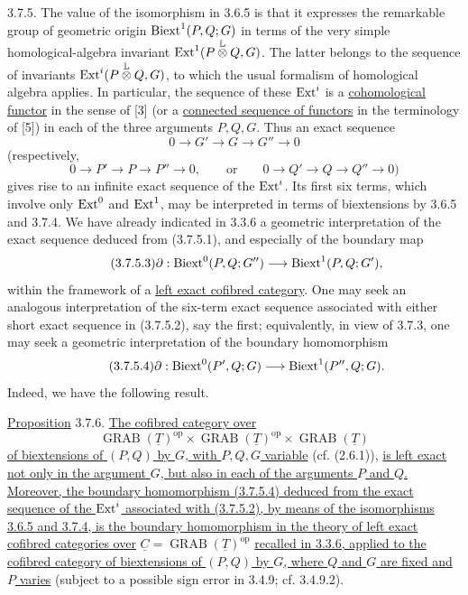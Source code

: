 3.7.5. The value of the isomorphism in 3.6.5 is that it expresses the
remarkable group of geometric origin $\operatorname{Biext}^1(P,Q;G)$ in terms of
the very simple homological-algebra invariant
$\operatorname{Ext}^1(P\mathbin{\overset{\mathbb L}{\otimes}}Q,G)$.  The latter
belongs to the sequence of invariants
$\operatorname{Ext}^i(P\mathbin{\overset{\mathbb L}{\otimes}}Q,G)$, to which the
usual formalism of homological algebra applies.  In particular, the
sequence of these $\operatorname{Ext}^i$ is a \underline{cohomological functor} in
the sense of [3] (or a \underline{connected sequence of functors} in
the terminology of [5]) in each of the three arguments $P,Q,G$.
Thus an exact sequence
\begin{equation}\tag{3.7.5.1}
 0\longrightarrow G'\longrightarrow G\longrightarrow G''
 \longrightarrow0
\end{equation}
(respectively,
\begin{equation}\tag{3.7.5.2}
 0\longrightarrow P'\longrightarrow P\longrightarrow P''
 \longrightarrow0,\qquad\text{or}\qquad
 0\longrightarrow Q'\longrightarrow Q\longrightarrow Q''
 \longrightarrow0)
\end{equation}
gives rise to an infinite exact sequence of the $\operatorname{Ext}^i$.  Its first
six terms, which involve only $\operatorname{Ext}^0$ and $\operatorname{Ext}^1$, may be
interpreted in terms of biextensions by 3.6.5 and 3.7.4.  We have
already indicated in 3.3.6 a geometric interpretation of the exact
sequence deduced from (3.7.5.1), and especially of the boundary map
\begin{equation}\tag{3.7.5.3}
 \partial:\operatorname{Biext}^0(P,Q;G'')\longrightarrow
 \operatorname{Biext}^1(P,Q;G'),
\end{equation}
within the framework of a \underline{left exact cofibred category}.
One may seek an analogous interpretation of the six-term exact
sequence associated with either short exact sequence in (3.7.5.2),
say the first; equivalently, in view of 3.7.3, one may seek a
geometric interpretation of the boundary homomorphism
\begin{equation}\tag{3.7.5.4}
 \partial:\operatorname{Biext}^0(P',Q;G)\longrightarrow
 \operatorname{Biext}^1(P'',Q;G).
\end{equation}
Indeed, we have the following result.

\underline{Proposition} 3.7.6. \underline{The cofibred category over}
\[
 \operatorname{GRAB}(\underline T)^{\mathrm{op}}
 \times\operatorname{GRAB}(\underline T)^{\mathrm{op}}
 \times\operatorname{GRAB}(\underline T)
\]
\underline{of biextensions of $(P,Q)$ by $G$, with $P,Q,G$
variable} (cf. (2.6.1)), \underline{is left exact not only in the
argument $G$, but also in each of the arguments $P$ and $Q$.
Moreover, the boundary homomorphism (3.7.5.4) deduced from the exact
sequence of the $\operatorname{Ext}^i$ associated with (3.7.5.2), by means of the
isomorphisms 3.6.5 and 3.7.4, is the boundary homomorphism in the
theory of left exact cofibred categories over}
$\underline C=\operatorname{GRAB}(\underline T)^{\mathrm{op}}$
\underline{recalled in 3.3.6, applied to the cofibred category of
biextensions of $(P,Q)$ by $G$, where $Q$ and $G$ are fixed and $P$
varies} (subject to a possible sign error in 3.4.9; cf. 3.4.9.2).


